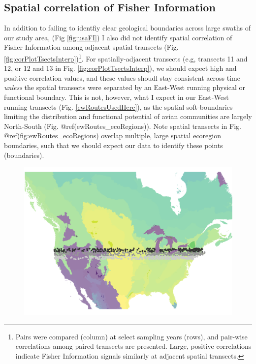 \documentclass[12pt,twoside,openany]{reedthesis}
\begin{document}
\subsection{Spatial correlation of Fisher
Information}\label{spatial-correlation-of-fisher-information-1}

In addition to failing to identfiy clear geological boundaries across
large swaths of our study area, (Fig \ref{fig:usaFI}) I also did not
identify spatial correlation of Fisher Information among adjacent
spatial transects (Fig. \ref{fig:corPlotTsectsInterp})\footnote{Pairs
  were compared (column) at select sampling years (rows), and pair-wise
  correlations among paired transects are presented. Large, positive
  correlations indicate Fisher Information signals similarly at adjacent
  spatial transects.}. For spatially-adjacent transects (e.g, transects
11 and 12, or 12 and 13 in Fig. \ref{fig:corPlotTsectsInterp}), we
should expect high and positive correlation values, and these values
shoudl stay consistent across time \emph{unless} the spatial transects
were separated by an East-West running physical or functional boundary.
This is not, however, what I expect in our East-West running transects
(Fig. \ref{ewRoutesUsedHere}), as the spatial soft-boundaries limiting
the distribution and functional potential of avian communities are
largely North-South (Fig. @ref(ewRoutes\_ecoRegions)). Note spatial
transects in Fig. @ref(fig:ewRoutes\_ecoRegions) overlap multiple, large
spatial ecoregion boundaries, such that we should expect our data to
identify these points (boundaries).
\begin{figure}
\includegraphics[width=0.85\linewidth]{./chapterFiles/fisherSpatial/figures/figsCalledInDiss/allRoutesUsed_ecoregions} \end{figure}
\end{document}
